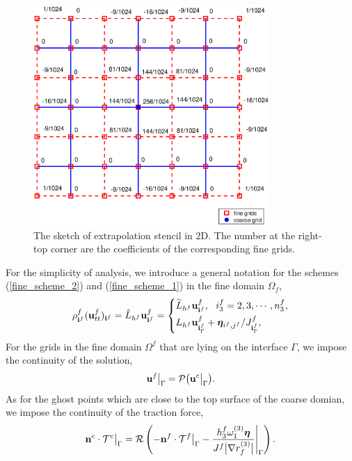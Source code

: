 \documentclass[a4paper]{article}
\newcommand{\wt}{\widetilde}
\begin{document}
\begin{figure}[H]
	\centering
	\includegraphics[width=0.8\textwidth]{extrapolation.eps}
	\caption{\scriptsize{The sketch of extrapolation stencil in $2$D. The number at the right-top corner are the coefficients of the corresponding fine grids.}}\label{extrapolation}
\end{figure}
 For the simplicity of analysis, we introduce a general notation for the schemes (\ref{fine_scheme_2}) and (\ref{fine_scheme_1}) in the fine domain $\Omega_f$,
\begin{align}\label{fine_scheme}
\rho^f_{{\bf i}^f} ({\bf u}_{tt}^f)_{{\bf i}^f} = \hat{L}_{h^f}{\bf u}^f_{{\bf i}^f} =  \left\{
\begin{aligned}
&\wt{L}_{h^f}{\bf{u}}^f_{{\bf i}^f}, \ \ i_3^f = 2,3,\cdots,n_3^f,\\
&L_{h^f}{\bf u}^f_{{\bf i}^f_{\Gamma}}+{\bm \eta}_{i^f,j^f}/J^f_{{\bf i}^f_{\Gamma}},
\end{aligned}
\right.
\end{align}
For the grids in the fine domain $\Omega^f$  that are lying on the interface $\Gamma$, we impose the continuity of the solution,
\begin{equation}\label{data_continuous_curvi}
{\bf u}^f\big|_{\Gamma} = \mathcal{P}\big({\bf u}^c\big|_{\Gamma}\big).
\end{equation}
As for the ghost points which are close to the top surface of the coarse domian, we impose the continuity of the traction force,
\begin{equation}\label{traction_continuous_curvi}
{\bf n}^c\cdot\mathcal{T}^c \big|_\Gamma = \mathcal{R}\left(-{\bf n}^f\cdot\mathcal{T}^f\big|_\Gamma - \frac{h_3^f\omega_1^{(3)}{\bm \eta}}{J^f\big|\nabla r_f^{(3)}\big|}\Bigg|_\Gamma\right).
\end{equation}
\end{document}
